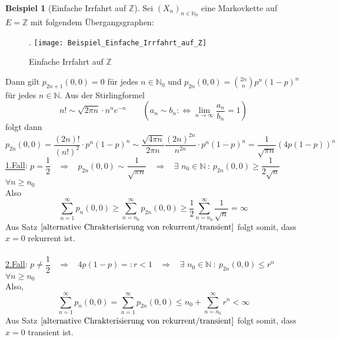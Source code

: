 \documentclass[a4paper,12pt]{scrartcl}
\theoremstyle{definition}
\newtheorem{bsp}{Beispiel}[section]
\begin{document}
\begin{bsp}[Einfache Irrfahrt auf $\mathbb{Z}$]
Sei $(X_{n})_{n \in \mathbb{N}_{0}}$ eine Markovkette auf $E=\mathbb{Z}$ mit folgendem Übergangsgraphen:
\begin{figure}[H].
\centering
\texttt{[image: Beispiel\_Einfache\_Irrfahrt\_auf\_Z]}
\caption{Einfache Irrfahrt auf $\mathbb{Z}$}
\end{figure}
\noindent
Dann gilt $p_{2n+1}(0,0) = 0$ für jedes $n \in \mathbb{N}_{0}$ und $p_{2n}(0,0) = \binom{2n}{n} p^{n} (1-p)^{n}$ für jedes $n \in \mathbb{N}$. Aus der Stirlingformel
\begin{equation*}
n! \sim \sqrt{2 \pi n} \cdot n^{n} e^{-n} \qquad (a_{n} \sim b_{n} :\Leftrightarrow \lim_{n \to \infty} \dfrac{a_{n}}{b_{n}} = 1)
\end{equation*}
folgt dann
\begin{equation*}
p_{2n}(0,0) = \dfrac{(2n)!}{(n!)^{2}} \cdot p^{n}(1-p)^{n} \sim \dfrac{\sqrt{4 \pi n}}{2 \pi n} \dfrac{(2n)^{2n}}{n^{2n}} \cdot p^{n} (1-p)^{n} = \dfrac{1}{\sqrt{\pi n}} (4p(1-p))^{n}
\end{equation*}
\underline{1.Fall}: $p=\dfrac{1}{2}$ $\:$  $\Rightarrow$ $\:$  $p_{2n}(0,0)$ $\sim$ $\dfrac{1}{\sqrt{\pi n}}$ $\:$  $\Rightarrow$ $\:$ $\exists$ $n_{0} \in \mathbb{N} \: : \: p_{2n}(0,0) \geq \dfrac{1}{2\sqrt{n}}$ $\:$  $\forall n \geq n_{0}$
\\
Also
\begin{equation*}
\sum_{n=1}^{\infty} p_{n}(0,0) \geq \sum_{n=n_{0}}^{\infty}p_{2n}(0,0) \geq \dfrac{1}{2} \sum_{n=n_{0}}^{\infty}\dfrac{1}{\sqrt{n}} = \infty
\end{equation*}
Aus Satz $\ref{alternative Chrakterisierung von rekurrent/transient}$ folgt somit, dass $x=0$ rekurrent ist.
\\
\\
\underline{2.Fall}: $p \neq \dfrac{1}{2}$ $\:$  $\Rightarrow$ $\:$ $4p(1-p) =: r < 1$ $\:$  $\Rightarrow$ $\:$ $\exists$ $n_{0} \in \mathbb{N} \: : \: p_{2n}(0,0) \leq r^{n}$ $\:$  $\forall n \geq n_{0}$
\\
Also,
\begin{equation*}
\sum_{n=1}^{\infty} p_{n}(0,0) = \sum_{n=1}^{\infty} p_{2n}(0,0) \leq n_{0} + \sum_{n=n_{0}}^{\infty} r^{n} < \infty
\end{equation*}
Aus Satz $\ref{alternative Chrakterisierung von rekurrent/transient}$ folgt somit, dass $x=0$ transient ist.
\end{bsp}
\end{document}
